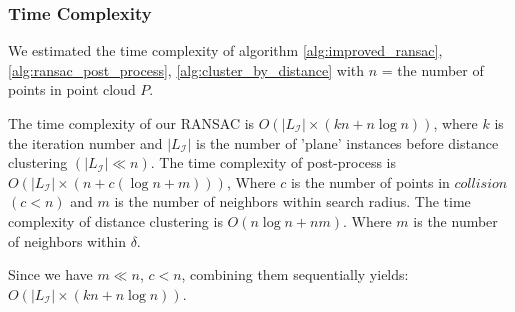 \documentclass[a4paper,9pt]{article}
\begin{document}
\subsubsection{Time Complexity}
We estimated the time complexity of algorithm \ref{alg:improved_ransac}, \ref{alg:ransac_post_process}, \ref{alg:cluster_by_distance} with $n$ = the number of points in point cloud $P$.
\\\par
The time complexity of our RANSAC is $O(|L_\mathcal{I}|\times(kn + n\log n))$, where $k$ is the iteration number and $|L_\mathcal{I}|$ is the number of 'plane' instances before distance clustering $(|L_\mathcal{I}| \ll n)$. The time complexity of post-process is $O(|L_\mathcal{I}| \times (n + c(\log n + m)))$, Where $c$ is the number of points in $collision$ $(c < n)$ and $m$ is the number of neighbors within search radius. The time complexity of distance clustering is $O(n\log n + nm)$. Where $m$ is the number of neighbors within $\delta$.
\\\par
Since we have $m \ll n$, $c < n$, combining them sequentially yields: $O(|L_\mathcal{I}|\times(kn + n\log n))$.






\end{document}
